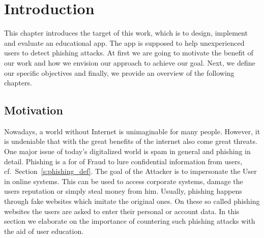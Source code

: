 \section{Introduction}
\label{s:introduction}
This chapter introduces the target of this work, which is to design, implement and evaluate an educational app. The app is supposed to help unexperienced users to detect phishing attacks. At first we are going to motivate the benefit of our work and how we envision our approach to achieve our goal. Next, we define our specific objectives and finally, we provide an overview of the following chapters.

\subsection{Motivation}
Nowadays, a world without Internet is unimaginable for many people. However, it is undeniable that with the great benefits of the internet also come great threats. One major issue of today's digitalized world is spam in general and phishing in detail.
Phishing is a for of Fraud to lure confidential information from users, cf.~Section~\ref{s:phishing_def}. The goal of the Attacker is to impersonate the User in online systems. This can be used to access corporate systems, damage the users reputation or simply steal money from him. Usually, phishing happens through fake websites which imitate the original ones. On these so called phishing websites the users are asked to enter their personal or account data. In this section we elaborate on the importance of countering such phishing attacks with the aid of user education. 

